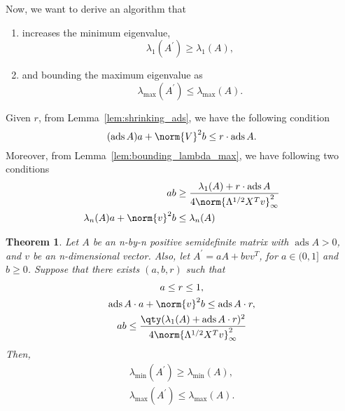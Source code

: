 \documentclass[nobib]{my-handout}
\newtheorem{theorem}{Theorem}
\theoremstyle{definition}
\theoremstyle{remark}
\DeclareMathOperator{\ads}{ads}
\begin{document}
Now, we want to derive an algorithm that
\begin{enumerate}
	\item increases the minimum eigenvalue,
		\begin{equation*}
			\lambda_1 (A^\prime) \ge \lambda_1 (A),
		\end{equation*}
	\item and bounding the maximum eigenvalue as
		\begin{equation*}
			\lambda_{\max}(A^\prime) \le \lambda_{\max}(A).
		\end{equation*}
\end{enumerate}

Given $r$, from Lemma~\ref{lem:shrinking_ads}, we have the following
condition
\begin{equation}
	(\ads{A}) a + \norm{V}^2 b \le r \cdot \ads{A}.
\end{equation}
Moreover, from Lemma~\ref{lem:bounding_lambda_max}, we have following two
conditions
\begin{equation}
	\begin{aligned}
		ab &\ge \frac{\lambda_1(A) + r \cdot \ads{A}}{4 \norm{\Lambda^{1/2} X^T
		v}_{\infty}^2} \\
		\lambda_n(A) a + \norm{v}^2 b &\le \lambda_n(A)
	\end{aligned}
\end{equation}

\begin{theorem}
	Let $A$ be an n-by-n positive semidefinite matrix with $\ads{A} > 0$, and $v$
	be an n-dimensional vector. Also, let $A^\prime = a A + b v v^T$, for $a \in
	(0, 1]$ and $b \ge 0$. Suppose that there exists $(a, b, r)$ such that
	\begin{subequations}
		\begin{gather}
			a \le r \le 1, \label{eq:thm_cond_sub1} \\
			\ads{A} \cdot a + \norm{v}^2 b \le \ads{A} \cdot r,
			\label{eq:thm_cond_sub2} \\
			a b \le \frac{\qty(\lambda_1(A) + \ads{A} \cdot r)^2}{4
			\norm{\Lambda^{1/2} X^T v}_{\infty}^2} \label{eq:thm_cond_sub3}
		\end{gather}
	\end{subequations}
	Then,
	\begin{subequations}
		\begin{gather}
			\lambda_{\min}(A^\prime) \ge \lambda_{\min}(A), \\
			\lambda_{\max}(A^\prime) \le \lambda_{\max}(A).
		\end{gather}
	\end{subequations}
\end{theorem}
\end{document}
